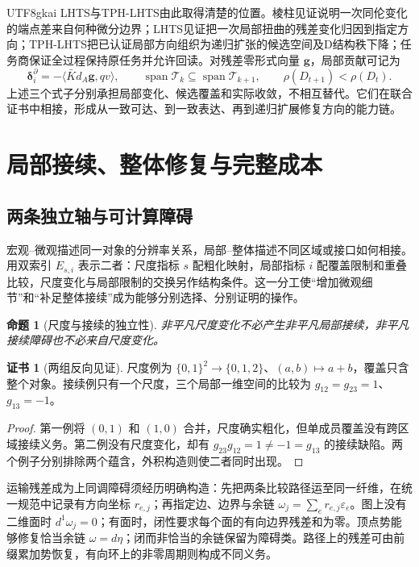 \documentclass[11pt,a4paper]{article}
\theoremstyle{plain}
\newtheorem{proposition}[theorem]{命题}
\theoremstyle{definition}
\newtheorem*{certificate}{证书}
\theoremstyle{remark}
\begin{document}
\begin{CJK*}{UTF8}{gkai}
LHTS与TPH-LHTS由此取得清楚的位置。棱柱见证说明一次同伦变化的端点差来自何种微分边界；LHTS见证把一次局部扭曲的残差变化归因到指定方向；TPH-LHTS把已认证局部方向组织为递归扩张的候选空间及D结构秩下降；任务商保证全过程保持原任务并允许回读。对残差零形式向量 $\mathbf g$，局部贡献可记为
\[
 \boldsymbol\delta_i^{\partial}=-\langle\bar Kd_A\mathbf g,qv\rangle,
 \qquad \operatorname{span}\mathcal T_k\subseteq\operatorname{span}\mathcal T_{k+1},
 \qquad \rho(D_{t+1})<\rho(D_t).
\]
上述三个式子分别承担局部变化、候选覆盖和实际收敛，不相互替代。它们在联合证书中相接，形成从一致可达、到一致表达、再到递归扩展修复方向的能力链。

\section{局部接续、整体修复与完整成本}
\label{pc:structure-cost}

\subsection{两条独立轴与可计算障碍}

宏观--微观描述同一对象的分辨率关系，局部--整体描述不同区域或接口如何相接。用双索引 $E_{s,i}$ 表示二者：尺度指标 $s$ 配粗化映射，局部指标 $i$ 配覆盖限制和重叠比较，尺度变化与局部限制的交换另作结构条件。这一分工使“增加微观细节”和“补足整体接续”成为能够分别选择、分别证明的操作。

\begin{proposition}[尺度与接续的独立性]
非平凡尺度变化不必产生非平凡局部接续，非平凡接续障碍也不必来自尺度变化。
\end{proposition}
\begin{certificate}[两组反向见证]
尺度例为 $\{0,1\}^2\to\{0,1,2\}$、$(a,b)\mapsto a+b$，覆盖只含整个对象。接续例只有一个尺度，三个局部一维空间的比较为 $g_{12}=g_{23}=1$、$g_{13}=-1$。
\end{certificate}
\begin{proof}
第一例将 $(0,1)$ 和 $(1,0)$ 合并，尺度确实粗化，但单成员覆盖没有跨区域接续义务。第二例没有尺度变化，却有 $g_{23}g_{12}=1\ne-1=g_{13}$ 的接续缺陷。两个例子分别排除两个蕴含，外积构造则使二者同时出现。
\end{proof}

运输残差成为上同调障碍须经历明确构造：先把两条比较路径运至同一纤维，在统一规范中记录有方向坐标 $r_{e,j}$；再指定边、边界与余链 $\omega_j=\sum_e r_{e,j}\varepsilon_e$。图上没有二维面时 $d^1\omega_j=0$；有面时，闭性要求每个面的有向边界残差和为零。顶点势能够修复恰当余链 $\omega=d\eta$；闭而非恰当的余链保留为障碍类。路径上的残差可由前缀累加势恢复，有向环上的非零周期则构成不同义务。


\end{CJK*}
\end{document}
